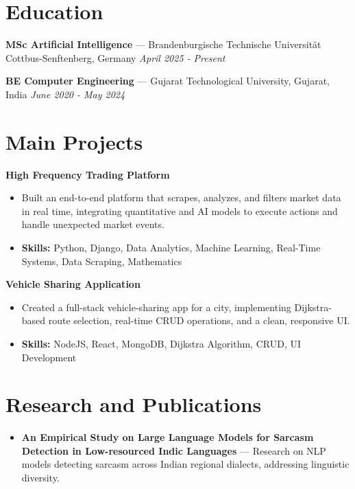 \documentclass[a4paper,10pt]{article}
\begin{document}
\section*{Education}
\textbf{MSc Artificial Intelligence} — Brandenburgische Technische Universität Cottbus-Senftenberg, Germany \hfill \textit{April 2025 - Present}\par
\vspace{1.5pt}
\textbf{BE Computer Engineering} — Gujarat Technological University, Gujarat, India \hfill \textit{June 2020 - May 2024}\par

\section*{Main Projects}
\textbf{High Frequency Trading Platform}\par
\vspace{1pt}
\begin{itemize}
  \item Built an end-to-end platform that scrapes, analyzes, and filters market data in real time, integrating quantitative and AI models to execute actions and handle unexpected market events.
  \item \textbf{Skills:} Python, Django, Data Analytics, Machine Learning, Real-Time Systems, Data Scraping, Mathematics
\end{itemize}
\vspace{3pt}
\textbf{Vehicle Sharing Application}\par
\vspace{1pt}
\begin{itemize}
  \item Created a full-stack vehicle-sharing app for a city, implementing Dijkstra-based route selection, real-time CRUD operations, and a clean, responsive UI.
  \item \textbf{Skills:} NodeJS, React, MongoDB, Dijkstra Algorithm, CRUD, UI Development
\end{itemize}

\section*{Research and Publications}
\begin{itemize}
\item \textbf{An Empirical Study on Large Language Models for Sarcasm Detection in Low-resourced Indic Languages} — Research on NLP models detecting sarcasm across Indian regional dialects, addressing linguistic diversity.
\end{itemize}
\end{document}

